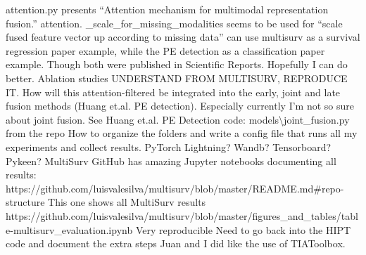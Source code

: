 \documentclass{article}%
\begin{document}
%
attention.py presents “Attention mechanism for multimodal representation fusion.” %
\newline%
\newline%
%
attention. \_scale\_for\_missing\_modalities seems to be used for “scale fused feature vector up according to missing data”%
\newline%
\newline%
%
can use multisurv as a survival regression paper example, while the PE detection as a classification paper example. Though both were published in Scientific Reports. Hopefully I can do better. %
\newline%
\newline%
%
Ablation studies %
\newline%
\newline%
%
UNDERSTAND FROM MULTISURV, REPRODUCE IT. %
\newline%
\newline%
%
How will this attention{-}filtered be integrated into the early, joint and late fusion methods (Huang et.al. PE detection). Especially currently I’m not so sure about joint fusion. %
\newline%
\newline%
%
See Huang et.al. PE Detection code: %
\newline%
\newline%
%
models\textbackslash{}joint\_fusion.py from the repo%
\newline%
\newline%
%
How to organize the folders and write a config file that runs all my experiments and collect results. PyTorch Lightning? Wandb? Tensorboard? Pykeen? %
\newline%
\newline%
%
MultiSurv GitHub has amazing Jupyter notebooks documenting all results: https://github.com/luisvalesilva/multisurv/blob/master/README.md\#repo{-}structure%
\newline%
\newline%
%
This one shows all MultiSurv results https://github.com/luisvalesilva/multisurv/blob/master/figures\_and\_tables/table{-}multisurv\_evaluation.ipynb%
\newline%
\newline%
%
Very reproducible %
\newline%
\newline%
%
Need to go back into the HIPT code and document the extra steps Juan and I did like the use of TIAToolbox. %
\newline%
\end{document}
